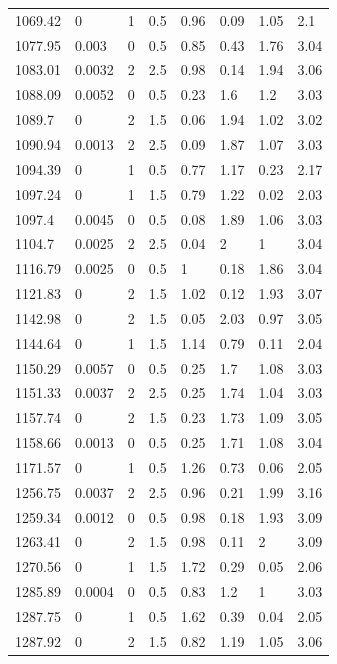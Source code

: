 \begin{longtable}[!h] {p{} p{} p{} p{} p{} p{} p{} p{}}
    1069.42 &	0       &	1   &	0.5	 &	0.96 &	0.09 &	1.05 &	2.1\\
    1077.95 &	0.003   &	0   &	0.5	 &	0.85 & 	0.43 &	1.76 &	3.04\\
    1083.01 &	0.0032  &	2	&   2.5	 &	0.98 &	0.14 &	1.94 &	3.06\\
    1088.09 &	0.0052	&   0	&   0.5	 &	0.23 &	1.6  &	1.2  &	3.03\\
    1089.7  &	0       &	2	&	1.5	 &	0.06 &	1.94 &	1.02 &	3.02\\
    1090.94 &	0.0013	&	2	&   2.5  &	0.09 &	1.87 &	1.07 &	3.03\\
    1094.39 &	0       &	1	&	0.5	 &	0.77 &	1.17 &	0.23 &	2.17\\
    1097.24 &	0       &	1	&	1.5	 &	0.79 &	1.22 & 	0.02 &	2.03\\
    1097.4  &	0.0045  &	0	&	0.5	 &	0.08 &	1.89 &	1.06 &	3.03\\
    1104.7  &	0.0025  &	2	&	2.5	 &	0.04 &	2    &	1    &	3.04\\
    1116.79 &	0.0025  &	0	&	0.5	 &	1    &	0.18 &	1.86 &	3.04\\
    1121.83 &	0       &	2	&	1.5	 &	1.02 & 	0.12 &	1.93 &	3.07\\
    1142.98 &	0       &	2	&	1.5	 &	0.05 &	2.03 &	0.97 &	3.05\\
    1144.64 &	0       &	1	&	1.5	 &	1.14 &	0.79 &	0.11 &	2.04\\
    1150.29 &	0.0057  &	0	&	0.5	 &	0.25 & 	1.7  &	1.08 &	3.03\\
    1151.33 &	0.0037  &	2	&	2.5	 &	0.25 & 	1.74 &	1.04 &	3.03\\
    1157.74 &	0       &	2	&	1.5	 &	0.23 &	1.73 &	1.09 &	3.05\\
    1158.66 &	0.0013  &	0	&	0.5	 &	0.25 &	1.71 &	1.08 &	3.04\\
    1171.57 &	0       &	1	&	0.5	 &	1.26 & 	0.73 &	0.06 &	2.05\\
    1256.75 &	0.0037  &	2	&	2.5	 &	0.96 &	0.21 &	1.99 &	3.16\\
    1259.34 &	0.0012  &	0	&	0.5	 &	0.98 &	0.18 &	1.93 &	3.09\\
    1263.41 &	0       &	2	&	1.5	 &	0.98 &	0.11 &	2    &	3.09\\
    1270.56 &	0       &	1	&	1.5	 &	1.72 &	0.29 &	0.05 &	2.06\\
    1285.89 &	0.0004  &	0	&	0.5	 &	0.83 &	1.2  &	1    &	3.03\\
    1287.75 &	0       &	1	&	0.5	 &	1.62 &	0.39 &	0.04 &	2.05\\
    1287.92 &	0       &	2	&	1.5	 &	0.82 &	1.19 &	1.05 &	3.06\\

\end{longtable}
